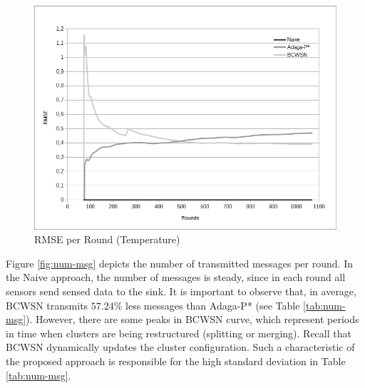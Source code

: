 \documentclass{acm_proc_article-sp}
\begin{document}
\begin{figure}[!htb]
\begin{center}
	\includegraphics[scale=0.45]{BCWSN-RMSExRound-PB.png}
	 \vspace*{-.5cm}
    \caption{RMSE per Round (Temperature)}
    \label{fig:rmse}
\end{center}
\end{figure}

Figure \ref{fig:num-msg} depicts the number of transmitted messages
per round. In the Naive approach, the number of messages is steady, since in
each round all sensors send sensed data to the sink. It is important to observe
that, in average, BCWSN transmits $57.24\%$ less messages than Adaga-P* (see Table
\ref{tab:num-msg}). However, there are some peaks in BCWSN curve, which
represent periods in time when clusters are being restructured (splitting or
merging). Recall that BCWSN dynamically updates the cluster configuration. Such
a characteristic of the proposed approach is responsible for the high standard
deviation in Table \ref{tab:num-msg}.
\end{document}
